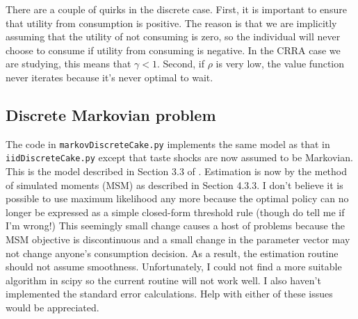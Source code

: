 There are a couple of quirks in the discrete case. First, it is important to ensure that utility from consumption is positive. The reason is that we are implicitly assuming that the utility of not consuming is zero, so the individual will never choose to consume if utility from consuming is negative. In the CRRA case we are studying, this means that \(\gamma < 1\). Second, if \(\rho\) is very low, the value function never iterates because it's never optimal to wait.


\subsection{Discrete Markovian problem}

The code in \texttt{markovDiscreteCake.py} implements the same model as that in \texttt{iidDiscreteCake.py} except that taste shocks are now assumed to be Markovian. This is the model described in Section 3.3 of \citet{adda2003dynamic}. Estimation is now by the method of simulated moments (MSM) as described in Section 4.3.3. I don't believe it is possible to use maximum likelihood any more because the optimal policy can no longer be expressed as a simple closed-form threshold rule (though do tell me if I'm wrong!) This seemingly small change causes a host of problems because the MSM objective is discontinuous and a small change in the parameter vector may not change anyone's consumption decision. As a result, the estimation routine should not assume smoothness. Unfortunately, I could not find a more suitable algorithm in scipy so the current routine will not work well. I also haven't implemented the standard error calculations. Help with either of these issues would be appreciated.


